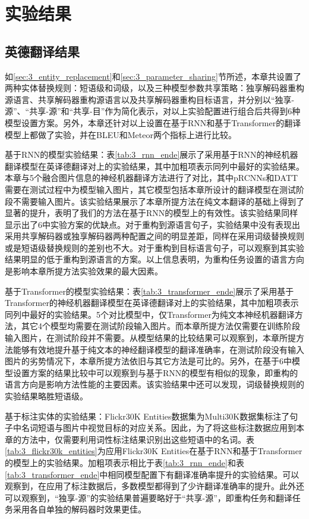\section{实验结果}

\subsection{英德翻译结果}

如\ref{sec:3_entity_replacement}和\ref{sec:3_parameter_sharing}节所述，本章共设置了两种实体替换规则：短语级和词级，以及三种模型参数共享策略：独享解码器重构源语言、共享解码器重构源语言以及共享解码器重构目标语言，并分别以“独享-源”、“共享-源”和“共享-目”作为简化表示，对以上实验配置进行组合后共得到6种模型设置方案。另外，本章还针对以上设置在基于RNN和基于Transformer的翻译模型上都做了实验，并在BLEU和Meteor两个指标上进行比较。

{\sffamily 基于RNN的模型实验结果：}表\ref{tab:3_rnn_ende}展示了采用基于RNN的神经机器翻译模型在英译德翻译对上的实验结果，其中加粗项表示同列中最好的实验结果。本章与5个融合图片信息的神经机器翻译方法进行了对比，其中pRCNNs和DATT需要在测试过程中为模型输入图片，其它模型包括本章所设计的翻译模型在测试阶段不需要输入图片。该实验结果展示了本章所提方法在纯文本翻译的基础上得到了显著的提升，表明了我们的方法在基于RNN的模型上的有效性。该实验结果同样显示出了6中实验方案的优缺点。对于重构到源语言句子，实验结果中没有表现出采用共享解码器或独享解码器两种配置之间的明显差距，同样在采用词级替换规则或是短语级替换规则的差别也不大。对于重构到目标语言句子，可以观察到其实验结果明显的低于重构到源语言的方案。以上信息表明，为重构任务设置的语言方向是影响本章所提方法实验效果的最大因素。


{\sffamily 基于Transformer的模型实验结果：}表\ref{tab:3_transformer_ende}展示了采用基于Transformer的神经机器翻译模型在英译德翻译对上的实验结果，其中加粗项表示同列中最好的实验结果。5个对比模型中，仅Transformer为纯文本神经机器翻译方法，其它4个模型均需要在测试阶段输入图片。而本章所提方法仅需要在训练阶段输入图片，在测试阶段并不需要。从模型结果的比较结果可以观察到，本章所提方法能够有效地提升基于纯文本的神经翻译模型的翻译准确率，在测试阶段没有输入图片的劣势情况下，本章所提方法依旧与其它方法是可比的。另外，在基于6中模型设置方案的结果比较中可以观察到与基于RNN的模型有相似的现象，即重构的语言方向是影响方法性能的主要因素。该实验结果中还可以发现，词级替换规则的实验结果略胜短语级。


{\sffamily 基于标注实体的实验结果：}Flickr30K Entities数据集为Multi30K数据集标注了句子中名词短语与图片中视觉目标的对应关系。因此，为了将这些标注数据应用到本章的方法中，仅需要利用词性标注结果识别出这些短语中的名词。表\ref{tab:3_flickr30k_entities}为应用Flickr30K Entities在基于RNN和基于Transformer的模型上的实验结果。加粗项表示相比于表\ref{tab:3_rnn_ende}和表\ref{tab:3_transformer_ende}中相同模型配置下有翻译准确率提升的实验结果。可以观察到，在应用了标注数据后，多数模型都得到了少许翻译准确率的提升。此外还可以观察到，“独享-源”的实验结果普遍要略好于“共享-源”，即重构任务和翻译任务采用各自单独的解码器时效果更佳。

